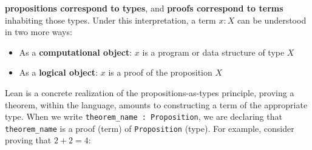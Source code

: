 \textbf{propositions correspond to types}, and \textbf{proofs correspond to terms} inhabiting those types.
Under this interpretation, a term $x : X$ can be understood in two more ways:
\begin{itemize}
  \item As a \textbf{computational object}: $x$ is a program or data structure of type $X$
  \item As a \textbf{logical object}: $x$ is a proof of the proposition $X$
\end{itemize}
Lean is a concrete realization of the propositions-as-types principle,
proving a theorem, within the language, amounts to constructing a term of the appropriate type.
When we write \lstinline[language=lean]|theorem_name : Proposition|, we are declaring that
\lstinline[language=lean]|theorem_name| is a proof (term) of \lstinline[language=lean]|Proposition| (type).
For example, consider proving that $2 + 2 = 4$:
